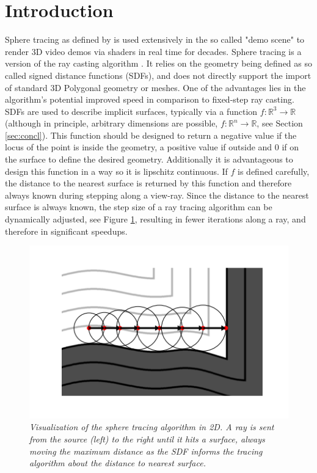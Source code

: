 \documentclass[twoside,a4paper]{article}
\begin{document}
\section{Introduction}
\label{sec:intro}
Sphere tracing as defined by \cite{hart_sphere_1996} is used extensively in the so called "demo scene" to render 3D video demos via shaders in real time for decades. 
Sphere tracing is a version of the ray casting algorithm \cite{roth_ray_1982}. It relies on the geometry being defined as so called signed distance functions (SDFs), and does not directly support the import of standard 3D Polygonal geometry or meshes. One of the advantages lies in the algorithm's potential improved speed in comparison to fixed-step ray casting. SDFs are used to describe implicit surfaces, typically via a function $f : \mathbb{R}^3 \rightarrow \mathbb{R}$(although in principle, arbitrary dimensions are possible, $f : \mathbb{R}^n \rightarrow \mathbb{R}$, see Section \ref{sec:concl}). This function should be designed to return a negative value if the locus of the point is inside the geometry, a positive value if outside and 0 if on the surface to define the desired geometry. Additionally it is advantageous to design this function in a way so it is lipschitz continuous. If $f$ is defined carefully, the distance to the nearest surface is returned by this function and therefore always known during stepping along a view-ray. 
Since the distance to the nearest surface is always known, the step size of a ray tracing algorithm can be dynamically adjusted, see Figure \ref{sphereViz}, resulting in fewer iterations along a ray, and therefore in significant speedups. 

\begin{figure}[ht]
\centerline{\includegraphics[scale=0.5]{img/sphereTracingViz.png}}
\caption{\label{sphereViz}{\it Visualization of the sphere tracing algorithm in 2D. A ray is sent from the source (left) to the right until it hits a surface, always moving the maximum distance as the SDF informs the tracing algorithm about the distance to nearest surface.}}
\end{figure}
\end{document}
